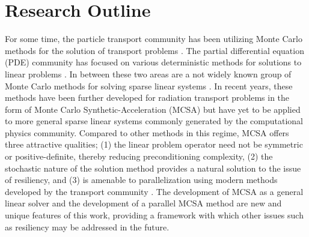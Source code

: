 \section{Research Outline}
\label{sec:research_outline}
For some time, the particle transport community has been utilizing
Monte Carlo methods for the solution of transport problems
\citep{lewis_computational_1993}. The partial differential equation
(PDE) community has focused on various deterministic methods for
solutions to linear problems \citep{saad_iterative_2003,
  kelley_iterative_1995}. In between these two areas are a not widely
known group of Monte Carlo methods for solving sparse linear systems
\citep{forsythe_matrix_1950, hammersley_monte_1964,
  halton_sequential_1962, halton_sequential_1994}. In recent years,
these methods have been further developed for radiation transport
problems in the form of Monte Carlo Synthetic-Acceleration (MCSA)
\citep{evans_monte_2009, evans_monte_2012} but have yet to be applied
to more general sparse linear systems commonly generated by the
computational physics community. Compared to other methods in this
regime, MCSA offers three attractive qualities; (1) the linear problem
operator need not be symmetric or positive-definite, thereby reducing
preconditioning complexity, (2) the stochastic nature of the solution
method provides a natural solution to the issue of resiliency, and (3)
is amenable to parallelization using modern methods developed by the
transport community \citep{wagner_hybrid_2010}. The development of
MCSA as a general linear solver and the development of a parallel MCSA
method are new and unique features of this work, providing a
framework with which other issues such as resiliency may be addressed
in the future.

